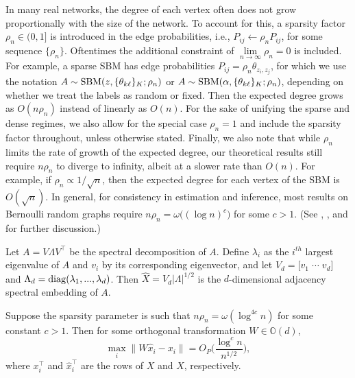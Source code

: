\documentclass[12pt]{article}
\begin{document}
\begin{remark}
In many real networks, the degree of each vertex often does not grow proportionally with the size of the network. 
To account for this, a sparsity factor $\rho_n \in (0, 1]$ is introduced in the edge probabilities, i.e., $P_{ij} \leftarrow \rho_n P_{ij}$, for some sequence $\{\rho_n\}$. 
Oftentimes the additional constraint of $\lim\limits_{n \to \infty} \rho_n = 0$ is included. 
For example, a sparse SBM has edge probabilities $P_{ij} = \rho_n \theta_{z_i, z_j}$, for which we use the notation $A \sim \mathrm{SBM}(z, \{\theta_{k \ell}\}_K; \rho_n)$ or $A \sim \mathrm{SBM}(\alpha, \{\theta_{k \ell}\}_K; \rho_n)$, depending on whether we treat the labels as random or fixed. 
Then the expected degree grows as $O(n \rho_n)$ instead of linearly as $O(n)$. 
For the sake of unifying the sparse and dense regimes, we also allow for the special case $\rho_n = 1$ and include the sparsity factor throughout, unless otherwise stated. 
Finally, we also note that while $\rho_n$ limits the rate of growth of the expected degree, our theoretical results still require $n \rho_n$ to diverge to infinity, albeit at a slower rate than $O(n)$. 
For example, if $\rho_n \propto 1 / \sqrt{n}$, then the expected degree for each vertex of the SBM is $O(\sqrt{n})$. 
In general, for consistency in estimation and inference, most results on Bernoulli random graphs require $n \rho_n = \omega \big( (\log n)^c \big)$ for some $c > 1$. 
(See \citet{JMLR:v18:16-480}, \citet{https://doi.org/10.48550/arxiv.2106.09840}, and \citet{rubindelanchy2017statistical} for further discussion.)
\end{remark}

\begin{definition}
\label{def:ase}
Let $A = V \Lambda V^\top$ be the spectral decomposition of $A$. 
Define $\lambda_i$ as the $i^{th}$ largest eigenvalue of $A$ and $v_i$ by its corresponding eigenvector, and let $V_d = \bigl[ v_1 \; \cdots \; v_d \bigr]$ and $\Lambda_d = \mathrm{diag}(\lambda_1, ..., \lambda_d)$. 
Then $\hat{X} = V_d |\Lambda|^{1/2}$ is the $d$-dimensional adjacency spectral embedding of $A$. 
\end{definition}

\begin{theorem}
\label{theorem:ase-consistency}
Suppose the sparsity parameter is such that $n \rho_n = \omega (\log^{4 c} n)$ for some constant $c > 1$. 
Then for some orthogonal transformation $W \in \mathbb{O}(d)$, 
$$\max_i \|W \hat{x}_i - x_i \| = O_P \bigg( \frac{\log^c n}{n^{1/2}} \bigg),$$
where $x_i^\top$ and $\hat{x}_i^\top$ are the rows of $X$ and $\hat{X}$, respectively. 
\end{theorem}
\end{document}
